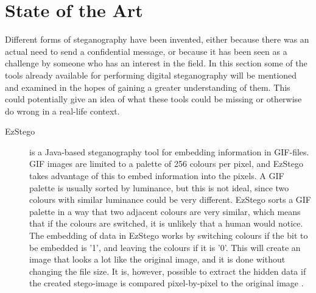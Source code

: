 \section{State of the Art}
\label{sec:SOTA}
Different forms of steganography have been invented, either because there was an actual need to send a confidential message, or because it has been seen as a challenge by someone who has an interest in the field.
In this section some of the tools already available for performing digital steganography will be mentioned and examined in the hopes of gaining a greater understanding of them.
This could potentially give an idea of what these tools could be missing or otherwise do wrong in a real-life context. 

\begin{description}
	\item[EzStego] is a Java-based steganography tool for embedding information in GIF-files. 
	GIF images are limited to a palette of 256 colours per pixel, and EzStego takes advantage of this to embed information into the pixels.
	A GIF palette is usually sorted by luminance, but this is not ideal, since two colours with similar luminance could be very different.
	EzStego sorts a GIF palette in a way that two adjacent colours are very similar, which means that if the colours are switched, it is unlikely that a 		human would notice.
	The embedding of data in EzStego works by switching colours if the bit to be embedded is '1', and leaving the colours if it is '0'.
	This will create an image that looks a lot like the original image, and it is done without changing the file size.
	It is, however, possible to extract the hidden data if the created stego-image is compared pixel-by-pixel to the original image \citep{Westfeld2000}.
	


\end{description}
